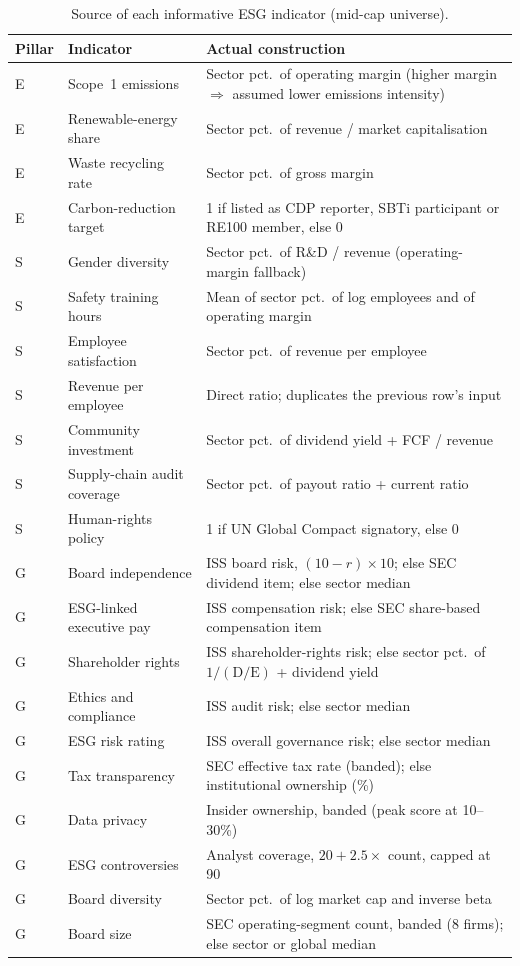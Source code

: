 \begin{table}[t]
\centering
\caption{Source of each informative ESG indicator (mid-cap universe).}
\label{tab:indicators}
\footnotesize
\begin{tabularx}{\textwidth}{@{}llX@{}}
\toprule
Pillar & Indicator & Actual construction \\
\midrule
E & Scope~1 emissions & Sector pct.\ of operating margin (higher margin $\Rightarrow$ assumed lower emissions intensity) \cite{konar2001does} \\
E & Renewable-energy share & Sector pct.\ of revenue / market capitalisation \\
E & Waste recycling rate & Sector pct.\ of gross margin \cite{guenster2011ecoefficiency} \\
E & Carbon-reduction target & 1 if listed as CDP reporter, SBTi participant or RE100 member, else 0 \\
\midrule
S & Gender diversity & Sector pct.\ of R\&D / revenue (operating-margin fallback) \\
S & Safety training hours & Mean of sector pct.\ of log employees and of operating margin \\
S & Employee satisfaction & Sector pct.\ of revenue per employee \cite{edmans_2011} \\
S & Revenue per employee & Direct ratio; duplicates the previous row's input \\
S & Community investment & Sector pct.\ of dividend yield + FCF / revenue \\
S & Supply-chain audit coverage & Sector pct.\ of payout ratio + current ratio \cite{krause2009supply} \\
S & Human-rights policy & 1 if UN Global Compact signatory, else 0 \\
\midrule
G & Board independence & ISS board risk, $(10-r)\times10$; else SEC dividend item; else sector median \\
G & ESG-linked executive pay & ISS compensation risk; else SEC share-based compensation item \\
G & Shareholder rights & ISS shareholder-rights risk; else sector pct.\ of $1/(\text{D/E})$ + dividend yield \\
G & Ethics and compliance & ISS audit risk; else sector median \\
G & ESG risk rating & ISS overall governance risk; else sector median \\
G & Tax transparency & SEC effective tax rate (banded); else institutional ownership (\%) \\
G & Data privacy & Insider ownership, banded (peak score at 10--30\%) \\
G & ESG controversies & Analyst coverage, $20+2.5\times$ count, capped at 90 \\
G & Board diversity & Sector pct.\ of log market cap and inverse beta \cite{adams2009women} \\
G & Board size & SEC operating-segment count, banded (8 firms); else sector or global median \\
\bottomrule
\end{tabularx}
\end{table}


